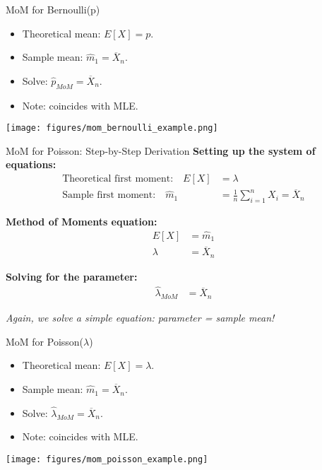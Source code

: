\begin{frame}{MoM for Bernoulli(p)}
  \begin{itemize}
    \item Theoretical mean: $E[X] = p$.
    \item Sample mean: $\hat{m}_1 = \overline{X}_n$.
    \item Solve: $\hat{p}_{MoM} = \overline{X}_n$.
    \item Note: coincides with MLE.
  \end{itemize}
  \begin{center}
    \texttt{[image: figures/mom\_bernoulli\_example.png]}
  \end{center}
\end{frame}

\begin{frame}{MoM for Poisson: Step-by-Step Derivation}
  \textbf{Setting up the system of equations:}
  \begin{align}
    \text{Theoretical first moment:} \quad E[X] &= \lambda \\
    \text{Sample first moment:} \quad \hat{m}_1 &= \frac{1}{n}\sum_{i=1}^n X_i = \overline{X}_n
  \end{align}

  \vspace{0.3cm}
  \textbf{Method of Moments equation:}
  \begin{align}
    E[X] &= \hat{m}_1 \\
    \lambda &= \overline{X}_n
  \end{align}

  \vspace{0.3cm}
  \textbf{Solving for the parameter:}
  \begin{align}
    \hat{\lambda}_{MoM} &= \overline{X}_n
  \end{align}

  \vspace{0.2cm}
  \textit{Again, we solve a simple equation: parameter = sample mean!}
\end{frame}

\begin{frame}{MoM for Poisson($\lambda$)}
  \begin{itemize}
    \item Theoretical mean: $E[X] = \lambda$.
    \item Sample mean: $\hat{m}_1 = \overline{X}_n$.
    \item Solve: $\hat{\lambda}_{MoM} = \overline{X}_n$.
    \item Note: coincides with MLE.
  \end{itemize}
  \begin{center}
    \texttt{[image: figures/mom\_poisson\_example.png]}
  \end{center}
\end{frame}

